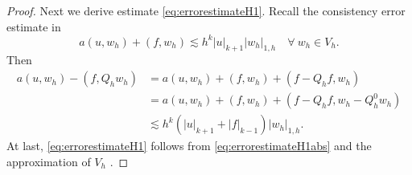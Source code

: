 \documentclass[10pt]{amsart}
\renewcommand{\div}{\operatorname{div}}
\numberwithin{equation}{section}
\begin{document}
\begin{proof}
Next we derive estimate \eqref{eq:errorestimateH1}. Recall the consistency error estimate in \cite[Lemma 5.5]{ChenHuang2020ncvem}
\[
a(u, w_h)+(f, w_h)\lesssim h^k|u|_{k+1}|w_h|_{1,h}\quad\forall~w_h\in V_h.
\]
Then 
\begin{align*}
a(u, w_h)-(f, Q_hw_h) 
&=a(u, w_h)+(f, w_h)+(f-Q_hf, w_h) \\
&=a(u, w_h)+(f, w_h)+(f-Q_hf, w_h-Q_h^0w_h) \\
&\lesssim h^k(|u|_{k+1}+|f|_{k-1})|w_h|_{1,h}.
\end{align*}
At last, \eqref{eq:errorestimateH1} follows from \eqref{eq:errorestimateH1abs} and the approximation of $V_h$ \cite{ChenHuang2020ncvem}.

\end{proof}
\end{document}
